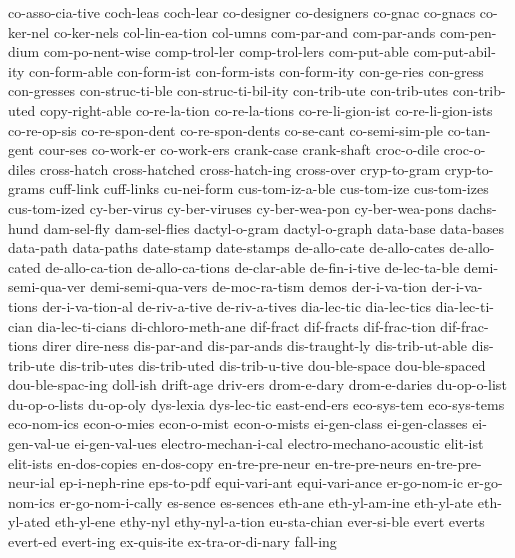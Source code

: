 {{{  co-asso-cia-tive
  coch-leas
  coch-lear
  co-designer
  co-designers
  co-gnac
  co-gnacs
  co-ker-nel
  co-ker-nels
  col-lin-ea-tion
  col-umns
  com-par-and
  com-par-ands
  com-pen-dium
  com-po-nent-wise
  comp-trol-ler
  comp-trol-lers
  com-put-able
  com-put-abil-ity
  con-form-able
  con-form-ist
  con-form-ists
  con-form-ity
  con-ge-ries
  con-gress
  con-gresses
  con-struc-ti-ble
  con-struc-ti-bil-ity
  con-trib-ute
  con-trib-utes
  con-trib-uted
  copy-right-able
  co-re-la-tion
  co-re-la-tions
  co-re-li-gion-ist
  co-re-li-gion-ists
  co-re-op-sis
  co-re-spon-dent
  co-re-spon-dents
  co-se-cant
  co-semi-sim-ple
  co-tan-gent
  cour-ses
  co-work-er
  co-work-ers
  crank-case
  crank-shaft
  croc-o-dile
  croc-o-diles
  cross-hatch
  cross-hatched
  cross-hatch-ing
  cross-over
  cryp-to-gram
  cryp-to-grams
  cuff-link
  cuff-links
  cu-nei-form
  cus-tom-iz-a-ble
  cus-tom-ize
  cus-tom-izes
  cus-tom-ized
  cy-ber-virus
  cy-ber-viruses
  cy-ber-wea-pon
  cy-ber-wea-pons
  dachs-hund
  dam-sel-fly
  dam-sel-flies
  dactyl-o-gram
  dactyl-o-graph
  data-base
  data-bases
  data-path
  data-paths
  date-stamp
  date-stamps
  de-allo-cate
  de-allo-cates
  de-allo-cated
  de-allo-ca-tion
  de-allo-ca-tions
  de-clar-able
  de-fin-i-tive
  de-lec-ta-ble
  demi-semi-qua-ver
  demi-semi-qua-vers
  de-moc-ra-tism
  demos
  der-i-va-tion
  der-i-va-tions
  der-i-va-tion-al
  de-riv-a-tive
  de-riv-a-tives
  dia-lec-tic
  dia-lec-tics
  dia-lec-ti-cian
  dia-lec-ti-cians
  di-chloro-meth-ane
  dif-fract
  dif-fracts
  dif-frac-tion
  dif-frac-tions
  direr
  dire-ness
  dis-par-and
  dis-par-ands
  dis-traught-ly
  dis-trib-ut-able
  dis-trib-ute
  dis-trib-utes
  dis-trib-uted
  dis-trib-u-tive
  dou-ble-space
  dou-ble-spaced
  dou-ble-spac-ing
  doll-ish
  drift-age
  driv-ers
  drom-e-dary
  drom-e-daries
  du-op-o-list
  du-op-o-lists
  du-op-oly
  dys-lexia
  dys-lec-tic
  east-end-ers
  eco-sys-tem
  eco-sys-tems
  eco-nom-ics
  econ-o-mies
  econ-o-mist
  econ-o-mists
  ei-gen-class
  ei-gen-classes
  ei-gen-val-ue
  ei-gen-val-ues
  electro-mechan-i-cal
  electro-mechano-acoustic
  elit-ist
  elit-ists
  en-dos-copies
  en-dos-copy
  en-tre-pre-neur
  en-tre-pre-neurs
  en-tre-pre-neur-ial
  ep-i-neph-rine
  eps-to-pdf
  equi-vari-ant
  equi-vari-ance
  er-go-nom-ic
  er-go-nom-ics
  er-go-nom-i-cally
  es-sence
  es-sences
  eth-ane
  eth-yl-am-ine
  eth-yl-ate
  eth-yl-ated
  eth-yl-ene
  ethy-nyl
  ethy-nyl-a-tion
  eu-sta-chian
  ever-si-ble
  evert
  everts
  evert-ed
  evert-ing
  ex-quis-ite
  ex-tra-or-di-nary
  fall-ing
}}}
